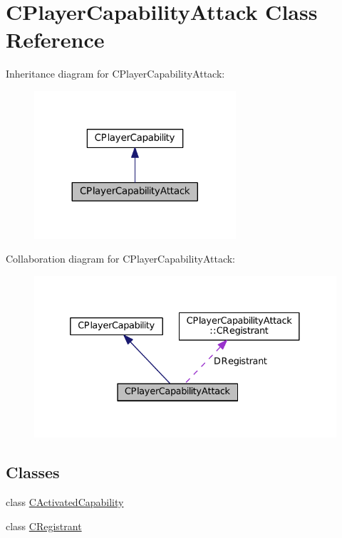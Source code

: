 \hypertarget{classCPlayerCapabilityAttack}{}\section{C\+Player\+Capability\+Attack Class Reference}
\label{classCPlayerCapabilityAttack}


Inheritance diagram for C\+Player\+Capability\+Attack\+:\nopagebreak
\begin{figure}[H]
\begin{center}
\leavevmode
\includegraphics[width=212pt]{classCPlayerCapabilityAttack__inherit__graph}
\end{center}
\end{figure}


Collaboration diagram for C\+Player\+Capability\+Attack\+:\nopagebreak
\begin{figure}[H]
\begin{center}
\leavevmode
\includegraphics[width=332pt]{classCPlayerCapabilityAttack__coll__graph}
\end{center}
\end{figure}
\subsection*{Classes}
\begin{DoxyCompactItemize}
\item 
class \hyperlink{classCPlayerCapabilityAttack_1_1CActivatedCapability}{C\+Activated\+Capability}
\item 
class \hyperlink{classCPlayerCapabilityAttack_1_1CRegistrant}{C\+Registrant}
\end{DoxyCompactItemize}
